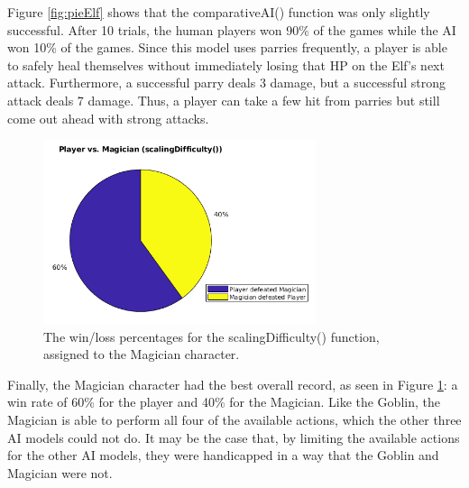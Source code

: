 Figure \ref{fig:pieElf} shows that the comparativeAI() function was only slightly successful. After 10 trials, the human players won 90\% of the games while the AI won 10\% of the games. Since this model uses parries frequently, a player is able to safely heal themselves without immediately losing that HP on the Elf's next attack. Furthermore, a successful parry deals 3 damage, but a successful strong attack deals 7 damage. Thus, a player can take a few hit from parries but still come out ahead with strong attacks.

\begin{figure}[H]
  \centering
  \includegraphics[width=8cm]{figures/magicianWins.png}
  \caption{The win/loss percentages for the scalingDifficulty() function, assigned to the Magician character.}
  \label{fig:pieMagician}
\end{figure}

Finally, the Magician character had the best overall record, as seen in Figure \ref{fig:pieMagician}: a win rate of 60\% for the player and 40\% for the Magician. Like the Goblin, the Magician is able to perform all four of the available actions, which the other three AI models could not do. It may be the case that, by limiting the available actions for the other AI models, they were handicapped in a way that the Goblin and Magician were not.\\

